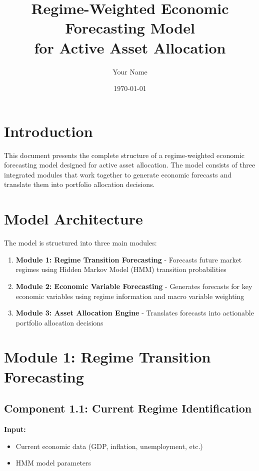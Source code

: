 \documentclass[11pt,a4paper]{article}
\title{Regime-Weighted Economic Forecasting Model\\for Active Asset Allocation}
\author{Your Name}
\date{\today}
\begin{document}
\maketitle

\tableofcontents
\newpage

\section{Introduction}

This document presents the complete structure of a regime-weighted economic forecasting model designed for active asset allocation. The model consists of three integrated modules that work together to generate economic forecasts and translate them into portfolio allocation decisions.

\section{Model Architecture}

The model is structured into three main modules:

\begin{enumerate}
    \item \textbf{Module 1: Regime Transition Forecasting} - Forecasts future market regimes using Hidden Markov Model (HMM) transition probabilities
    \item \textbf{Module 2: Economic Variable Forecasting} - Generates forecasts for key economic variables using regime information and macro variable weighting
    \item \textbf{Module 3: Asset Allocation Engine} - Translates forecasts into actionable portfolio allocation decisions
\end{enumerate}

\section{Module 1: Regime Transition Forecasting}

\subsection{Component 1.1: Current Regime Identification}

\textbf{Input:}
\begin{itemize}
    \item Current economic data (GDP, inflation, unemployment, etc.)
    \item HMM model parameters
\end{itemize}
\end{document}
